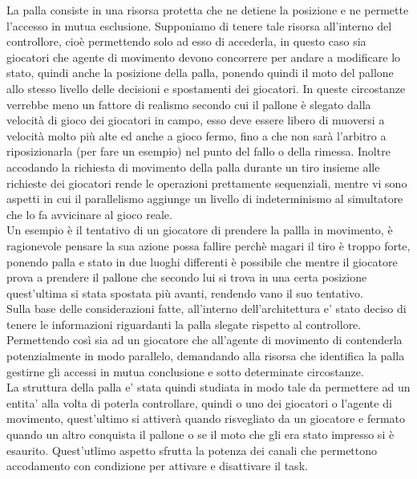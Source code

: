La palla consiste in una risorsa protetta che ne detiene la posizione e ne permette l'accesso in mutua esclusione. Supponiamo di tenere tale risorsa all'interno del controllore, cioè permettendo solo ad esso di accederla, in questo caso sia giocatori che agente di movimento devono concorrere per andare a modificare lo stato, quindi anche la posizione della palla, ponendo quindi il moto del pallone allo stesso livello delle decisioni e spostamenti dei giocatori. In queste circostanze verrebbe meno un fattore di realismo secondo cui il pallone è slegato dalla velocità di gioco dei giocatori in campo, esso deve essere libero di muoversi a velocità molto più alte ed anche a gioco fermo, fino a che non sarà l'arbitro a riposizionarla (per fare un esempio) nel punto del fallo o della rimessa. Inoltre accodando la richiesta di movimento della palla durante un tiro insieme alle richieste dei giocatori rende le operazioni prettamente sequenziali, mentre vi sono aspetti in cui il parallelismo aggiunge un livello di indeterminismo al simultatore che lo fa avvicinare al gioco reale.\\

Un esempio è il tentativo di un giocatore di prendere la pallla in movimento, è ragionevole pensare la sua azione possa fallire perchè magari il tiro è troppo forte, ponendo palla e stato in due luoghi differenti è possibile che mentre il giocatore prova a prendere il pallone che secondo lui si trova in una certa posizione quest'ultima si stata spostata più avanti, rendendo vano il suo tentativo.\\

Sulla base delle considerazioni fatte, all'interno dell'architettura e' stato deciso di tenere le informazioni riguardanti la palla slegate rispetto al controllore. Permettendo così sia ad un giocatore che all'agente di movimento di contenderla potenzialmente in modo parallelo, demandando alla risorsa che identifica la palla gestirne gli accessi in mutua conclusione e sotto determinate circostanze.\\

La struttura della palla e' stata quindi studiata in modo tale da permettere ad un entita' alla volta di poterla controllare, quindi o uno dei giocatori o l'agente di movimento, quest'ultimo si attiverà quando risvegliato da un giocatore e fermato quando un altro conquista il pallone o se il moto che gli era stato impresso si è esaurito. Quest'utlimo aspetto sfrutta la potenza dei canali che permettono accodamento con condizione per attivare e disattivare il task.

